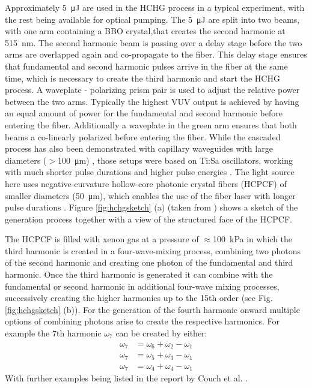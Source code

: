 Approximately \qty{5}{\micro\joule} are used in the HCHG process in a typical experiment, with the rest being available for optical pumping.
The \qty{5}{\micro\joule} are split into two beams, with one arm containing a BBO crystal,that creates the second harmonic at \qty{515}{\nano\meter}.
The second harmonic beam is passing over a delay stage before the two arms are overlapped again and co-propagate to the fiber.
This delay stage ensures that fundamental and second harmonic pulses arrive in the fiber at the same time, which is necessary to create the third harmonic and start the HCHG process.
A waveplate - polarizing prism pair is used to adjust the relative power between the two arms.
Typically the highest VUV output is achieved by having an equal amount of power for the fundamental and second harmonic before entering the fiber.
Additionally a waveplate in the green arm ensures that both beams a co-linearly polarized before entering the fiber.
While the cascaded process has also been demonstrated with capillary waveguides with large diameters ($>$\qty{100}{\micro\meter}) \cite{misoguti_generation_2001}, those setups were based on Ti:Sa oscillators, working with much shorter pulse durations and higher pulse energies \cite{misoguti_generation_2001,durfee_phase_2002,misoguti_nonlinear_2005}.
The light source here uses negative-curvature hollow-core photonic crystal fibers (HCPCF) of smaller diameters (\qty{50}{\micro\meter}), which enables the use of the fiber laser with longer pulse durations \cite{couch_ultrafast_2020}.
Figure \ref{fig:hchgsketch} (a) (taken from \cite{couch_ultrafast_2020}) shows a sketch of the generation process together with a view of the structured face of the HCPCF.

The HCPCF is filled with xenon gas at a pressure of $\approx$\qty{100}{\kilo\pascal} in which the third harmonic is created in a four-wave-mixing process, combining two photons of the second harmonic and creating one photon of the fundamental and third harmonic.
Once the third harmonic is generated it can combine with the fundamental or second harmonic in additional four-wave mixing processes, successively creating the higher harmonics up to the 15th order (see Fig. \ref{fig:hchgsketch} (b)).
For the generation of the fourth harmonic onward multiple options of combining photons arise to create the respective harmonics.
For example the 7th harmonic $\omega_7$ can be created by either:
\begin{equation}
\begin{aligned}
	\omega_7 &= \omega_6 + \omega_2 - \omega_1 \\
	\omega_7 &= \omega_5 + \omega_3 - \omega_1 \\
	\omega_7 &= \omega_4 + \omega_4 - \omega_1
\end{aligned}
\label{eq:vuv_pathway}
\end{equation}
With further examples being listed in the report by Couch et al. \cite{couch_ultrafast_2020}.

